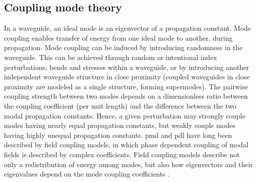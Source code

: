 \documentclass[../report.tex]{subfiles}
\begin{document}
	\subsection{Coupling mode theory}\label{concept:mode_coupling}
In a waveguide, an ideal mode is an eigenvector of a propagation constant. Mode coupling enables transfer of energy from one ideal mode to another, during propagation. Mode coupling can be induced by introducing randomness in the waveguide. This can be achieved through random or intentional index perturbations, bends and stresses within a waveguide, or by introducing another independent waveguide structure in close proximity (coupled waveguides in close proximity are modeled as a single structure, forming supermodes). The pairwise coupling strength between two modes depends on a dimensionless ratio between the coupling coefficient (per unit length) and the difference between the two modal propagation constants. Hence, a given perturbation may strongly couple modes having nearly equal propagation constants, but weakly couple modes having highly unequal propagation constants. \gls{pmd} and \gls{pdl} have long been described by field coupling models, in which phase dependent coupling of modal fields is described by complex coefficients. Field coupling models describe not only a redistribution of energy among modes, but also how eigenvectors and their eigenvalues depend on the mode coupling coefficients \cite{kahn_mode_2012}.
\end{document}
